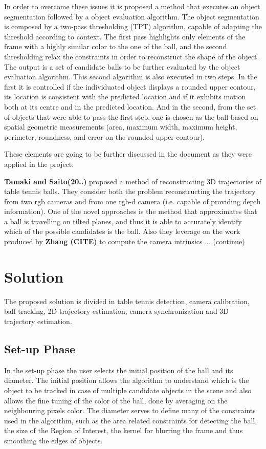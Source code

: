 \documentclass[a4paper]{article}
\begin{document}
In order to overcome these issues it is proposed a method that executes an object segmentation followed by a object evaluation algorithm. The object segmentation is composed by a two-pass thresholding (TPT) algorithm, capable of adapting the threshold according to context. The first pass highlights only elements of the frame with a highly similar color to the one of the ball, and the second thresholding relax the constraints in order to reconstruct the shape of the object. The output is a set of candidate balls to be further evaluated by the object evaluation algorithm. This second algorithm is also executed in two steps. In the first it is controlled if the individuated object displays a rounded upper  contour, its location is consistent with the predicted location and if it exhibits motion both at its centre and in the predicted location. And in the second, from the set of objects that were able to pass the first step, one is chosen as the ball based on spatial geometric measurements (area, maximum width, maximum height, perimeter, roundness, and error on the rounded upper contour).

These elements are going to be further discussed in the document as they were applied in the project.

\textbf{Tamaki and Saito(20..)} proposed a method of reconstructing 3D trajectories of table tennis balls. They consider both the problem reconstructing the trajectory from two rgb cameras and from one rgb-d camera (i.e. capable of providing depth information). One of the novel approaches is the method that approximates that a ball is travelling on tilted planes, and thus it is able to accurately identify which of the possible candidates is the ball. Also they leverage on the work produced by\textbf{ Zhang (CITE)} to compute the camera intrinsics ... (continue)


\section{Solution}

The proposed solution is divided in table tennis detection, camera calibration, ball tracking, 2D trajectory estimation, camera synchronization and 3D trajectory estimation.
\subsection{Set-up Phase}

	In the set-up phase the user selects the initial position of the ball and its diameter. The initial position allows the algorithm to understand which is the object to be tracked in case of multiple candidate objects in the scene and also allows the fine tuning of the color of the ball, done by averaging on the neighbouring pixels color. The diameter serves to define many of the constraints used in the algorithm, such as the area related constraints for detecting the ball, the size of the Region of Interest, the kernel for blurring the frame and thus smoothing the edges of objects.
\end{document}

